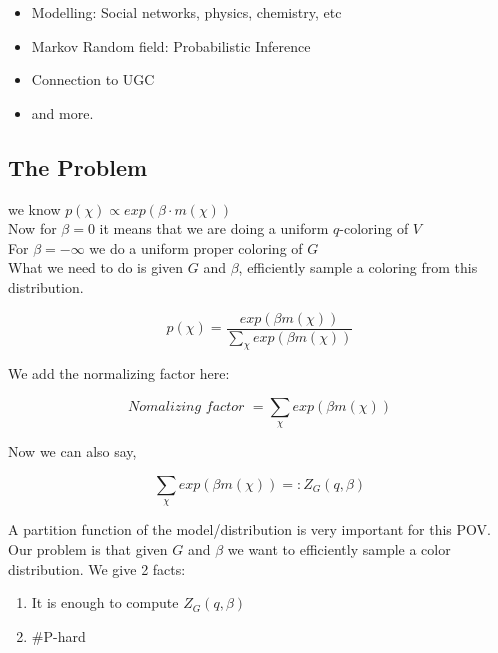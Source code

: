 \documentclass{article}
\begin{document}
\begin{itemize}
    \item Modelling: Social networks, physics, chemistry, etc
    \item Markov Random field: Probabilistic Inference
    \item Connection to UGC \citet{coulson_et_al:LIPIcs:2020:12565}
    \item and more.
\end{itemize}

\subsection{The Problem}

\noindent we know $p(\chi) \propto exp(\beta \cdot m(\chi))$\\

\noindent Now for $\beta = 0$ it means that we are doing a uniform $q$-coloring of $V$\\

\noindent For $\beta = -\infty$ we do a uniform proper coloring of $G$\\

\noindent What we need to do is given $G$ and $\beta$, efficiently sample a coloring from this distribution.

\begin{equation}
    p(\chi) = \frac{exp(\beta m(\chi))}{\sum_{\chi}exp(\beta m(\chi))}
\end{equation}

\noindent We add the normalizing factor here:

\begin{equation*}
    \textit{Nomalizing factor } = \sum_{\chi}exp(\beta m(\chi))
\end{equation*}

\noindent Now we can also say,

\begin{equation}
    \sum_{\chi}exp(\beta m(\chi)) =: Z_G(q,\beta)
\end{equation}

\noindent A partition function of the model/distribution is very important for this POV.\\

\noindent Our problem is that given $G$ and $\beta$ we want to efficiently sample a color distribution. We give 2 facts:

\begin{enumerate}
    \item It is enough to compute $Z_G(q,\beta)$
    \item \#P-hard
\end{enumerate}
\end{document}
